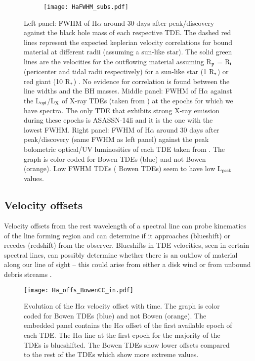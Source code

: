 \documentclass[structabstract]{aa}
\begin{document}
\begin{figure*}
        \centering
        \begin{subfigure}[b]{1\textwidth}
            \centering
            \texttt{[image: HaFWHM\_subs.pdf]}
        \end{subfigure}
        \caption{Left panel: FWHM of H$\alpha$ around 30 days after peak/discovery against the black hole mass of each respective TDE. The dashed red lines represent the expected keplerian velocity correlations for bound material at different radii (assuming a sun-like star). The solid green lines are the velocities for the outflowing material assuming R$_{\rm p}$ = R$_{\rm t}$ (pericenter and tidal radii respectively) for a sun-like star (1 R$_{\rm *}$) or red giant (10 R$_{\rm *}$) \citep{Arcavi2014}. No evidence for correlation is found between the line widths and the BH masses. Middle panel: FWHM of H$\alpha$ against the L$_{\rm opt}$/L$_{\rm X}$ of X-ray TDEs (taken from \citealt{Wevers2019}) at the epochs for which we have spectra. The only TDE that exhibits strong X-ray emission during these epochs is ASASSN-14li and it is the one with the lowest FWHM. Right panel: FWHM of H$\alpha$ around 30 days after peak/discovery (same FWHM as left panel) against the peak bolometric optical/UV luminosities of each TDE taken from \citet{Hinkle2020}. The graph is color coded for Bowen  TDEs (blue) and not Bowen (orange). Low FWHM TDEs ( Bowen TDEs) seem to have low L$_{\rm peak}$ values.} 
        \label{fig:Ha_FWHM_MBH_Lp_Lx}
    \end{figure*}


\subsection{Velocity offsets} \label{sub:loff}

Velocity offsets from the rest wavelength of a spectral line can probe kinematics of the line forming region and can determine if it approaches (blueshift) or recedes (redshift) from the observer. Blueshifts in TDE velocities, seen in certain spectral lines, can possibly determine whether there is an outflow of material along our line of sight -- this could arise from either a disk wind or from unbound debris streams \citep{Nicholl2019,Hung2019,Nicholl2020}. 
\begin{figure}
\centering
\texttt{[image: Ha\_offs\_BowenCC\_in.pdf]}
\caption{Evolution of the H$\alpha$ velocity offset with time. The graph is color coded for Bowen  TDEs (blue) and not Bowen (orange). The embedded panel contains the H$\alpha$ offset of the first available epoch of each TDE. The H$\alpha$ line at the first epoch for the majority of the TDEs is blueshifted. The  Bowen TDEs show lower offsets compared to the rest of the TDEs which show more extreme values.}
\label{fig:ha_off}
\end{figure}
\end{document}
